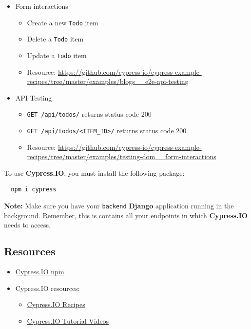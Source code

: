 \documentclass{article}
\begin{document}
\begin{itemize}
  \item Form interactions
  \begin{itemize}
    \item Create a new \texttt{Todo} item
    \item Delete a \texttt{Todo} item
    \item Update a \texttt{Todo} item
    \item Resource: \footnotesize\href{https://github.com/cypress-io/cypress-example-recipes/tree/master/examples/blogs\_\_e2e-api-testing}{https://github.com/cypress-io/cypress-example-recipes/tree/master/examples/blogs\_\_e2e-api-testing}
  \end{itemize}
  \item API Testing
  \begin{itemize}
    \item \texttt{GET /api/todos/} returns status code 200
    \item \texttt{GET /api/todos/<ITEM\_ID>/} returns status code 200
    \item Resource: \footnotesize\href{https://github.com/cypress-io/cypress-example-recipes/tree/master/examples/testing-dom\_\_form-interactions}{https://github.com/cypress-io/cypress-example-recipes/tree/master/examples/testing-dom\_\_form-interactions}
  \end{itemize}
\end{itemize}

To use \textbf{Cypress.IO}, you must install the following package:

\begin{verbatim}
  npm i cypress
\end{verbatim}

\textbf{Note:} Make sure you have your \texttt{backend} \textbf{Django} application running in the background. Remember, this is contains all your endpoints in which \textbf{Cypress.IO} needs to access.

\subsection*{Resources} 
\begin{itemize}
  \item \href{https://www.npmjs.com/package/cypress}{Cypress.IO npm}
  \item Cypress.IO resources:
  \begin{itemize}
    \item \href{https://docs.cypress.io/examples/examples/recipes.html#Fundamentals}{Cypress.IO Recipes}
    \item \href{https://docs.cypress.io/examples/examples/recipes.html#Fundamentals}{Cypress.IO Tutorial Videos}
  \end{itemize}
\end{itemize}
 
\end{document}
